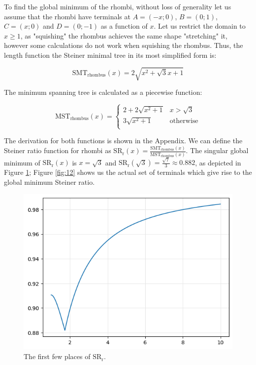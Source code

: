 \documentclass{mpaper}
\begin{document}
To find the global minimum of the rhombi, without loss of generality let us assume that the rhombi have terminals at $A=(-x;0)$, $B=(0;1)$, $C=(x;0)$ and $D=(0;-1)$ as a function of $x$. Let us restrict the domain to $x\geq1$, as "squishing" the rhombus achieves the same shape "stretching" it, however some calculations do not work when squishing the rhombus. Thus, the length function the Steiner minimal tree in its most simplified form is:

\begin{equation}
  \label{eq:1}
  \operatorname{SMT_{rhombus}}(x)=2\sqrt{x^2+\sqrt{3}x+1}
\end{equation}

The minimum spanning tree is calculated as a piecewise function:

\begin{equation}
  \label{eq:2}
  \operatorname{MST_{rhombus}}(x)=  
  \begin{cases} 
    2+2\sqrt{x^2+1} & x >\sqrt{3} \\
    3\sqrt{x^2+1} & \text{otherwise} \\
  \end{cases}
\end{equation}

The derivation for both functions is shown in the Appendix. We can define the Steiner ratio function for rhombi as $\operatorname{SR_r}(x) = \frac{\operatorname{SMT_{rhombus}}(x)}{\operatorname{MST_{rhombus}}(x)}$. The singular global minimum of $\operatorname{SR_r}(x)$ is $x=\sqrt{3}$ and $\operatorname{SR_r}(\sqrt{3})=\frac{\sqrt{7}}{3}\approx 0.882$, as depicted in Figure \ref{fig:11}; Figure \ref{fig:12} shows us the actual set of terminals which give rise to the global minimum Steiner ratio.

\begin{figure}[h!]
  \begin{center}
  \includegraphics[scale=0.5]{plot10.png}
  \end{center}
  \caption{\label{fig:11} The first few places of $\operatorname{SR_{r}}$.}
\end{figure}
\end{document}
